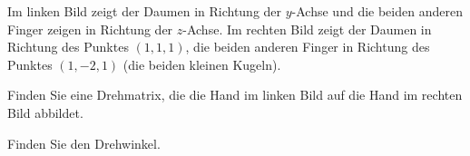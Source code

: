 Im linken Bild zeigt der Daumen in Richtung der $y$-Achse und die beiden
anderen Finger zeigen in Richtung der $z$-Achse.
Im rechten Bild zeigt der Daumen in Richtung des Punktes $(1,1,1)$, die
beiden anderen Finger in Richtung des Punktes $(1,-2,1)$ (die beiden kleinen
Kugeln).
\begin{center}
\end{center}
\begin{teilaufgaben}
\item Finden Sie eine Drehmatrix, die die Hand im linken Bild auf die
Hand im rechten Bild abbildet.
\item Finden Sie den Drehwinkel.
\end{teilaufgaben}


